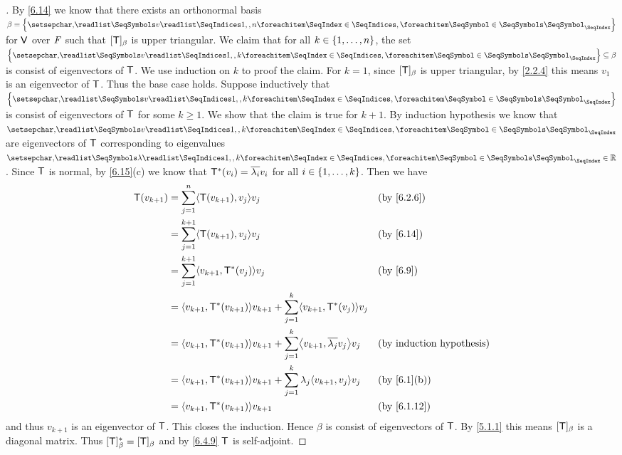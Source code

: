 \begin{proof}[]
  By \cref{6.14} we know that there exists an orthonormal basis \(\beta = \set{\seq{v}{1,,n}}\) for \(\mathsf{V}\) over \(\mathit{F}\) such that \([\mathsf{T}]_{\beta}\) is upper triangular.
  We claim that for all \(k \in \left\lbrace1, \dots, n\right\rbrace\), the set \(\set{\seq{v}{1,,k}} \subseteq \beta\) is consist of eigenvectors of \(\mathsf{T}\).
  We use induction on \(k\) to proof the claim.
  For \(k = 1\), since \([\mathsf{T}]_{\beta}\) is upper triangular, by \cref{2.2.4} this means \(v_1\) is an eigenvector of \(\mathsf{T}\).
  Thus the base case holds.
  Suppose inductively that \(\set{\seq{v}{1,,k}}\) is consist of eigenvectors of \(\mathsf{T}\) for some \(k \geq 1\).
  We show that the claim is true for \(k + 1\).
  By induction hypothesis we know that \(\seq{v}{1,,k}\) are eigenvectors of \(\mathsf{T}\) corresponding to eigenvalues \(\seq{\lambda}{1,,k} \in \R\).
  Since \(\mathsf{T}\) is normal, by \cref{6.15}(c) we know that \(\mathsf{T}^*(v_i) = \overline{\lambda_i} v_i\) for all \(i \in \left\lbrace1, \dots, k\right\rbrace\).
  Then we have
  \begin{align*}
    \T(v_{k + 1}) & = \sum_{j = 1}^n \inn{\T(v_{k + 1}), v_j} v_j                                                           &  & \text{(by \cref{6.2.6})}         \\
                  & = \sum_{j = 1}^{k + 1} \inn{\T(v_{k + 1}), v_j} v_j                                                     &  & \text{(by \cref{6.14})}          \\
                  & = \sum_{j = 1}^{k + 1} \inn{v_{k + 1}, \T^*(v_j)} v_j                                                   &  & \text{(by \cref{6.9})}           \\
                  & = \inn{v_{k + 1}, \T^*(v_{k + 1})} v_{k + 1} + \sum_{j = 1}^k \inn{v_{k + 1}, \T^*(v_j)} v_j                                                  \\
                  & = \inn{v_{k + 1}, \T^*(v_{k + 1})} v_{k + 1} + \sum_{j = 1}^k \inn{v_{k + 1}, \conj{\lambda_j} v_j} v_j &  & \text{(by induction hypothesis)} \\
                  & = \inn{v_{k + 1}, \T^*(v_{k + 1})} v_{k + 1} + \sum_{j = 1}^k \lambda_j \inn{v_{k + 1}, v_j} v_j        &  & \text{(by \cref{6.1}(b))}        \\
                  & = \inn{v_{k + 1}, \T^*(v_{k + 1})} v_{k + 1}                                                            &  & \text{(by \cref{6.1.12})}
  \end{align*}
  and thus \(v_{k + 1}\) is an eigenvector of \(\mathsf{T}\).
  This closes the induction.
  Hence \(\beta\) is consist of eigenvectors of \(\mathsf{T}\).
  By \cref{5.1.1} this means \([\mathsf{T}]_{\beta}\) is a diagonal matrix.
  Thus \([\mathsf{T}]_{\beta}^* = [\mathsf{T}]_{\beta}\) and by \cref{6.4.9} \(\mathsf{T}\) is self-adjoint.
\end{proof}
